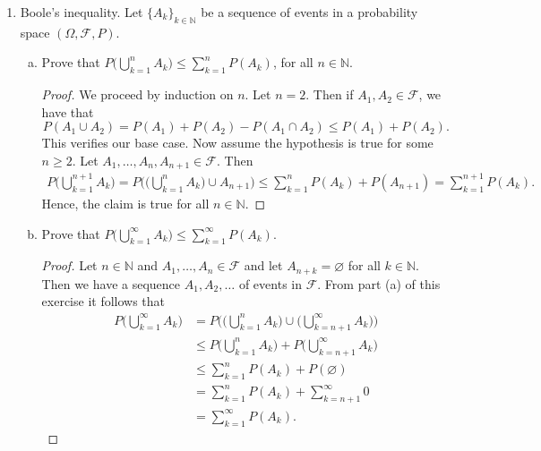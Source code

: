 \documentclass[12pt]{article}
\begin{document}
\begin{enumerate}
\begin{proof}
    hypothesis and a single set. Together this is essentially the case of
unioning two events together.  \end{proof} \item Boole's inequality. Let
$\{A_k\}_{k\in\mathbb{N}}$ be a sequence of events in a probability space
$(\Omega, \mathcal{F}, P)$.  \begin{enumerate}[(a)] \item Prove that
        $P\big(\bigcup_{k=1}^{n}A_k\big)\leq \sum_{k=1}^{n}P(A_k)$, for all
        $n\in\mathbb{N}$.  \begin{proof} We proceed by induction on $n$. Let
            $n=2$. Then if $A_1, A_2\in\mathcal{F}$, we have that
            \begin{equation*} P(A_1\cup A_2)=P(A_1)+P(A_2)-P(A_1\cap A_2)\leq
            P(A_1)+P(A_2).  \end{equation*} This verifies our base case. Now
            assume the hypothesis is true for some $n\geq 2$. Let $A_1, \dots,
            A_n, A_{n+1}\in\mathcal{F}$. Then \begin{align*}
            P\big(\bigcup_{k=1}^{n+1}A_k\big)
        =P\big(\big(\bigcup_{k=1}^{n}A_k\big)\cup A_{n+1}\big) \leq\sum_{k=1}^n
    P(A_k)+P(A_{n+1}) =\sum_{k=1}^{n+1}P(A_k).  \end{align*} Hence, the claim
    is true for all $n\in\mathbb{N}$.  \end{proof} \item Prove that
    $P\big(\bigcup_{k=1}^{\infty}A_k\big)\leq \sum_{k=1}^{\infty}P(A_k)$.
    \begin{proof} Let $n\in\mathbb{N}$ and $A_1, \dots, A_n\in\mathcal{F}$ and
        let $A_{n+k}=\varnothing$ for all $k\in\mathbb{N}$. Then we have
        a sequence $A_1, A_2, \dots$ of events in $\mathcal{F}$. From part (a)
        of this exercise it follows that \begin{align*}
            P\big(\bigcup_{k=1}^{\infty}A_k\big)
            &=P\big(\big(\bigcup_{k=1}^{n}A_k\big)
            \cup\big(\bigcup_{k=n+1}^{\infty}A_k\big)\big) \\ &\leq
            P\big(\bigcup_{k=1}^{n}A_k\big)+P\big(\bigcup_{k=n+1}^{\infty}A_k\big)
            \\ &\leq \sum_{k=1}^{n}P(A_k)+P(\varnothing) \\
            &=\sum_{k=1}^{n}P(A_k)+\sum_{k=n+1}^{\infty}0 \\
            &=\sum_{k=1}^{\infty}P(A_k).  \end{align*} \end{proof}

\end{enumerate}
\end{enumerate}
\end{document}
